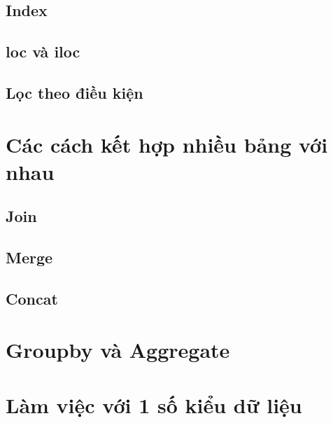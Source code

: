 \documentclass[
]{book}
\begin{document}
\hypertarget{index}{%
\section{Index}\label{index}}

\hypertarget{loc-vuxe0-iloc}{%
\section{loc và iloc}\label{loc-vuxe0-iloc}}

\hypertarget{lux1ecdc-theo-ux111iux1ec1u-kiux1ec7n}{%
\section{Lọc theo điều kiện}\label{lux1ecdc-theo-ux111iux1ec1u-kiux1ec7n}}

\hypertarget{cuxe1c-cuxe1ch-kux1ebft-hux1ee3p-nhiux1ec1u-bux1ea3ng-vux1edbi-nhau}{%
\chapter{Các cách kết hợp nhiều bảng với nhau}\label{cuxe1c-cuxe1ch-kux1ebft-hux1ee3p-nhiux1ec1u-bux1ea3ng-vux1edbi-nhau}}

\hypertarget{join}{%
\section{Join}\label{join}}

\hypertarget{merge}{%
\section{Merge}\label{merge}}

\hypertarget{concat}{%
\section{Concat}\label{concat}}

\hypertarget{groupby-vuxe0-aggregate}{%
\chapter{Groupby và Aggregate}\label{groupby-vuxe0-aggregate}}

\hypertarget{luxe0m-viux1ec7c-vux1edbi-1-sux1ed1-kiux1ec3u-dux1eef-liux1ec7u}{%
\chapter{Làm việc với 1 số kiểu dữ liệu}\label{luxe0m-viux1ec7c-vux1edbi-1-sux1ed1-kiux1ec3u-dux1eef-liux1ec7u}}
\end{document}
